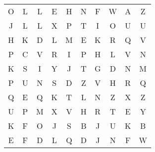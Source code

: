 \documentclass{standalone}
\begin{document}
\begin{center}
\renewcommand{\arraystretch}{1.5}{
\noindent\begin{tabular}{cccccccccc}O & L & L & E & H & N & F & W & A & Z \\ 
J & L & L & X & P & T & I & O & U & U \\ 
H & K & D & L & M & E & K & R & Q & V \\ 
P & C & V & R & I & P & H & L & V & N \\ 
K & S & I & Y & J & T & G & D & N & M \\ 
P & U & N & S & D & Z & V & H & R & Q \\ 
Q & E & Q & K & T & L & N & Z & X & Z \\ 
U & P & M & X & V & H & R & T & E & Y \\ 
K & F & O & J & S & B & J & U & K & B \\ 
E & F & D & L & Q & D & J & N & F & W
\end{tabular}
}
\end{center}
\end{document}
